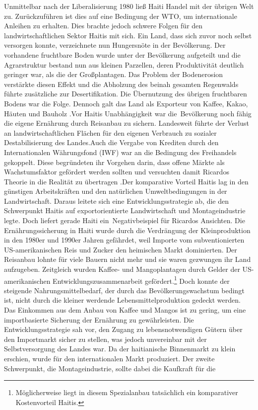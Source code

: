 Unmittelbar nach der Liberalisierung 1980 lie{\ss} Haiti Handel mit der {\"u}brigen Welt zu. Zur{\"u}ckzuf{\"u}hren ist dies auf eine Bedingung der WTO, um internationale Anleihen zu erhalten. Dies brachte jedoch schwere Folgen f{\"u}r den landwirtschaftlichen Sektor Haitis mit sich. Ein Land, dass sich zuvor noch selbst versorgen konnte, verzeichnete nun Hungersn{\"o}te in der Bev{\"o}lkerung. Der vorhandene fruchtbare Boden wurde unter der Bev{\"o}lkerung aufgeteilt und die Agrarstruktur bestand nun aus kleinen Parzellen, deren Produktivit{\"a}t deutlich geringer war, als die der Gro{\ss}plantagen. Das Problem der Bodenerosion verst{\"a}rkte diesen Effekt und die Abholzung des beinah gesamten Regenwalds f{\"u}hrte zus{\"a}tzliche zur Desertifikation. Die {\"U}bernutzung des {\"u}brigen fruchtbaren Bodens war die Folge. Dennoch galt das Land als Exporteur von Kaffee, Kakao, H{\"a}uten und Bauholz \citep{King.2005}.\newline Vor Haitis Unabh{\"a}ngigkeit war die~Bev{\"o}lkerung noch f{\"a}hig die eigene Ern{\"a}hrung durch Reisanbau zu sichern. Landesweit f{\"u}hrte der Verlust an landwirtschaftlichen Fl{\"a}chen f{\"u}r den eigenen Verbrauch zu sozialer Destabilisierung des Landes.\newline Auch die Vergabe von Krediten durch den Internationalen W{\"a}hrungsfond (IWF) war an die Bedingung des Freihandels gekoppelt. Diese begr{\"u}ndeten ihr Vorgehen darin, dass offene M{\"a}rkte als Wachstumsfaktor gef{\"o}rdert werden sollten und versuchten damit Ricardos Theorie in die Realit{\"a}t zu {\"u}bertragen \citep{InternationalMonetaryFund.2007,Weiss.2008}.\newline Der komparative Vorteil Haitis lag in den g{\"u}nstigen Arbeitskr{\"a}ften und den nat{\"u}rlichen Umweltbedingungen in der Landwirtschaft. Daraus leitete sich eine Entwicklungsstrategie ab, die den Schwerpunkt Haitis auf exportorientierte Landwirtschaft und Montageindustrie legte. Doch liefert gerade Haiti ein~Negativbeispiel f{\"u}r Ricardos Ansichten. Die Ern{\"a}hrungssicherung in Haiti wurde durch die Verdr{\"a}ngung der Kleinproduktion in den 1980er und 1990er Jahren gef{\"a}hrdet, weil Importe vom subventionierten US-amerikanischen Reis und Zucker den heimischen Markt dominierten. Der Reisanbau lohnte f{\"u}r viele Bauern nicht mehr und sie waren gezwungen ihr Land aufzugeben. Zeitgleich wurden Kaffee- und Mangoplantagen durch Gelder der US-amerikanischen Entwicklungszusammenarbeit gef{\"o}rdert.\footnote{M{\"o}glicherweise liegt in diesem Spezialanbau tats{\"a}chlich ein komparativer Kostenvorteil Haitis.} Doch konnte der steigende Nahrungsmittelbedarf, der durch das Bev{\"o}lkerungswachstum bedingt ist, nicht durch die kleiner werdende Lebensmittelproduktion gedeckt werden. Das Einkommen aus dem Anbau von Kaffee und Mangos ist zu gering, um eine importbasierte Sicherung der Ern{\"a}hrung zu gew{\"a}hrleisten. Die Entwicklungsstrategie sah vor, den Zugang zu lebensnotwendigen G{\"u}tern {\"u}ber den Importmarkt sicher zu stellen, was jedoch unvereinbar mit der Selbstversorgung des Landes war. Da der haitianische Binnenmarkt zu klein erschien, wurde f{\"u}r den internationalen Markt produziert. Der zweite Schwerpunkt, die Montageindustrie, sollte dabei die Kaufkraft f{\"u}r die 